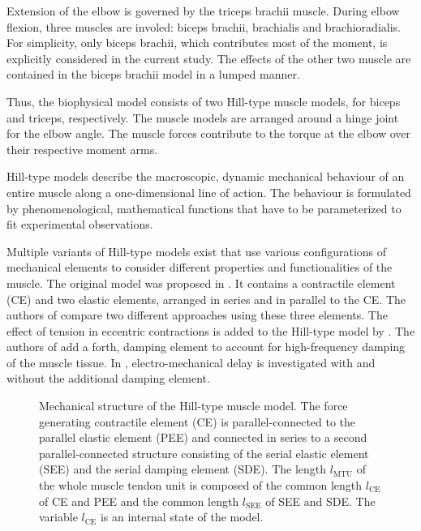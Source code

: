 Extension of the elbow is governed by the triceps brachii muscle.
During elbow flexion, three muscles are involed: biceps brachii, brachialis and brachioradialis. For simplicity, only biceps brachii, which contributes most of the moment, is explicitly considered in the current study. The effects of the other two muscle are contained in the biceps brachii model in a lumped manner.

Thus, the biophysical model consists of two Hill-type muscle models, for biceps and triceps, respectively. The muscle models are arranged around a hinge joint for the elbow angle. The muscle forces contribute to the torque at the elbow over their respective moment arms.

Hill-type models describe the macroscopic, dynamic mechanical behaviour of an entire muscle along a one-dimensional line of action.
The behaviour is formulated by phenomenological, mathematical functions that have to be parameterized to fit experimental observations.

Multiple variants of Hill-type models exist that use various configurations of mechanical elements to consider different properties and functionalities of the muscle. The original model was proposed in \cite{Hill1938}. It contains a contractile element (\ac{CE}) and two elastic elements, arranged in series and in parallel to the \ac{CE}.
The authors of \cite{Siebert2008} compare two different approaches using these three elements. The effect of tension in eccentric contractions is added to the Hill-type model by \cite{Till2008}. The authors of \cite{Gunther2007} add a forth, damping element to account for high-frequency damping of the muscle tissue. In \cite{Morl2012}, electro-mechanical delay is investigated with and without the additional damping element. 

\begin{figure}%
  \centering%
  \def\svgwidth{0.5\textwidth}
  \caption{Mechanical structure of the Hill-type muscle model. The force generating contractile element (\ac{CE}) is parallel-connected to the parallel elastic element (PEE) and connected in series to a second parallel-connected structure consisting of the serial elastic element (\ac{SEE}) and the serial damping element (SDE). The length $l_\text{MTU}$ of the whole muscle tendon unit is composed of the common length $l_\text{CE}$ of CE and PEE and the common length $l_\text{SEE}$ of SEE and SDE. The variable $l_\text{CE}$ is an internal state of the model.}
  \label{fig:hilltype}%
\end{figure}%

